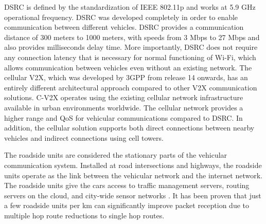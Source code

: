 \documentclass[12pt]{article}
\begin{document}
DSRC is defined by the standardization of IEEE 802.11p and works at 5.9 GHz operational frequency. DSRC was developed completely in order to enable communication between different vehicles. DSRC provides a communication distance of 300 meters to 1000 meters, with speeds from 3 Mbps to 27 Mbps and also provides milliseconds delay time. More importantly, DSRC does not require any connection latency that is necessary for normal functioning of Wi-Fi, which allows communication between vehicles even without an existing network.
The cellular V2X, which was developed by 3GPP from release 14 onwards, has an entirely different architectural approach compared to other V2X communication solutions. C-V2X operates using the existing cellular network infrastructure available in urban environments worldwide. The cellular network provides a higher range and QoS for vehicular communications compared to DSRC. In addition, the cellular solution supports both direct connections between nearby vehicles and indirect connections using cell towers.

The roadside units are considered the stationary parts of the vehicular communication system. Installed at road intersections and highways, the roadside units operate as the link between the vehicular network and the internet network. The roadside units give the cars access to traffic management servers, routing servers on the cloud, and city-wide sensor networks \cite{nzouonta2009vanet}. It has been proven that just a few roadside units per km can significantly improve packet reception due to multiple hop route reductions to single hop routes.
\end{document}
